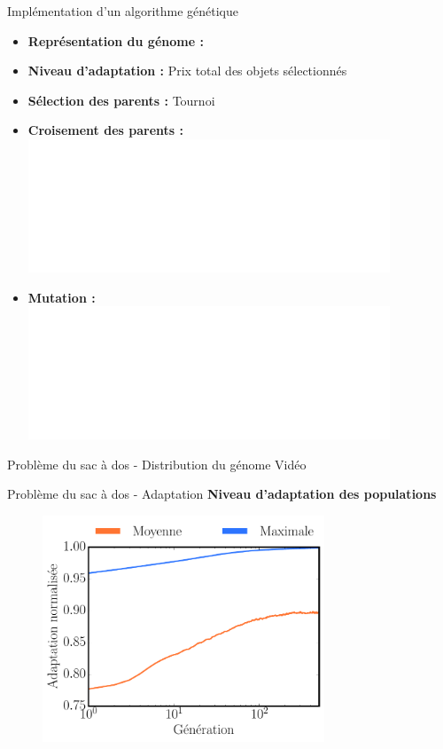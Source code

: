 \begin{frame}{Implémentation d'un algorithme génétique}
\begin{itemize}
  \item \textbf{Représentation du génome : } 
  \item \textbf{Niveau d'adaptation :} Prix total des objets sélectionnés 
  \item \textbf{Sélection des parents : } Tournoi
  \item \textbf{Croisement des parents : } \\ \vspace{5pt}
  \includegraphics<1>[width=0.85\textwidth]{figures/croisement.pdf}
  \item \textbf{Mutation :} \\ \vspace{5pt}
  \includegraphics<1>[width=0.85\textwidth]{figures/mutation.pdf}
\end{itemize}
  
\end{frame}

\begin{frame}{Problème du sac à dos - Distribution du génome}
  Vidéo
\end{frame}

\begin{frame}{Problème du sac à dos - Adaptation}
\vspace{-10pt}
\textbf{Niveau d'adaptation des populations}
  \begin{figure}[h!]
    \centering
    \includegraphics[width=0.75\textwidth]{figures/knapsack_adaptation.pdf}
  \end{figure}
\end{frame}
